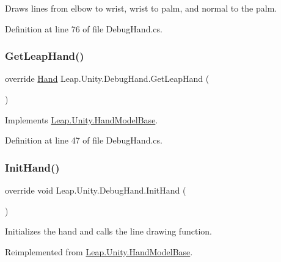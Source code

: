 Draws lines from elbow to wrist, wrist to palm, and normal to the palm. 

Definition at line 76 of file Debug\+Hand.\+cs.

\mbox{\label{class_leap_1_1_unity_1_1_debug_hand_a406218fbf7d947d156064ccc5ac84d06}} 
\subsubsection{\texorpdfstring{GetLeapHand()}{GetLeapHand()}}
{\footnotesize\ttfamily override \mbox{\hyperlink{class_leap_1_1_hand}{Hand}} Leap.\+Unity.\+Debug\+Hand.\+Get\+Leap\+Hand (\begin{DoxyParamCaption}{ }\end{DoxyParamCaption})\hspace{0.3cm}{\ttfamily [virtual]}}



Implements \mbox{\hyperlink{class_leap_1_1_unity_1_1_hand_model_base_aa24ca02bf4a64ba33b0370ad6da8731f}{Leap.\+Unity.\+Hand\+Model\+Base}}.



Definition at line 47 of file Debug\+Hand.\+cs.

\mbox{\label{class_leap_1_1_unity_1_1_debug_hand_a504064bb8442d990fbd080bda3c1c02c}} 
\subsubsection{\texorpdfstring{InitHand()}{InitHand()}}
{\footnotesize\ttfamily override void Leap.\+Unity.\+Debug\+Hand.\+Init\+Hand (\begin{DoxyParamCaption}{ }\end{DoxyParamCaption})\hspace{0.3cm}{\ttfamily [virtual]}}

Initializes the hand and calls the line drawing function. 

Reimplemented from \mbox{\hyperlink{class_leap_1_1_unity_1_1_hand_model_base_a4789222f2b16957437c703f15afc1bbf}{Leap.\+Unity.\+Hand\+Model\+Base}}.



